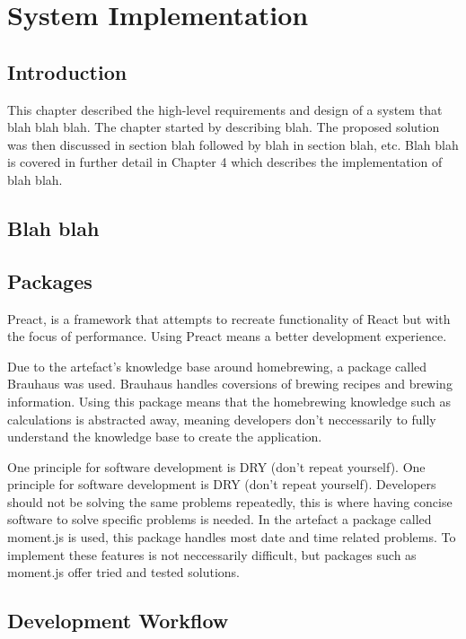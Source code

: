 \chapter{System Implementation}

\section{Introduction} \label{s-i--introduction}

This chapter described the high-level requirements and design of a system that blah blah blah.  The chapter started by describing blah.  The proposed solution was then discussed in section blah followed by blah in section blah, etc.
Blah blah is covered in further detail in Chapter 4 which describes the implementation of blah blah.

\section{Blah blah}


\section{Packages}

Preact, is a framework that attempts to recreate functionality of React but with the focus of performance. Using Preact means a better development experience. %

Due to the artefact's knowledge base around homebrewing, a package called Brauhaus was used. Brauhaus handles coversions of brewing recipes and brewing information. Using this package means that the homebrewing knowledge such as calculations is abstracted away, meaning developers don't neccessarily to fully understand the knowledge base to create the application. %

One principle for software development is DRY (don't repeat yourself). One principle for software development is DRY (don't repeat yourself). Developers should not be solving the same problems repeatedly, this is where having concise software to solve specific problems is needed. In the artefact a package called moment.js is used, this package handles most date and time related problems. To implement these features is not neccessarily difficult, but packages such as moment.js offer tried and tested solutions. %

\section{Development Workflow}

